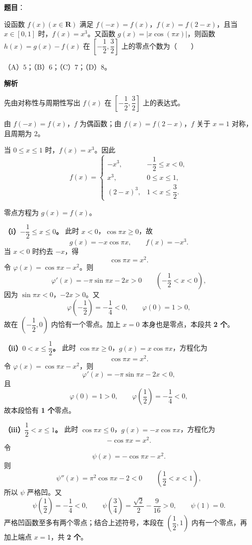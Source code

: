\begin{answer}

\textbf{题目}：

设函数 $f(x)(x\in\mathbf R)$ 满足 $f(-x)=f(x)$，$f(x)=f(2-x)$，且当 $x\in[0,1]$ 时，$f(x)=x^3$。又函数 $g(x)=|x\cos(\pi x)|$，则函数 $h(x)=g(x)-f(x)$ 在 $\left[-\dfrac12,\dfrac32\right]$ 上的零点个数为\mbox{（　　）}

（A）$5$；（B）$6$；（C）$7$；（D）$8$。

\textbf{解析}

先由对称性与周期性写出 $f(x)$ 在 $\left[-\dfrac12,\dfrac32\right]$ 上的表达式。

由 $f(-x)=f(x)$，$f$ 为偶函数；由 $f(x)=f(2-x)$，$f$ 关于 $x=1$ 对称，且周期为 $2$。

当 $0\leqslant x\leqslant1$ 时，$f(x)=x^3$。因此
\nopagebreak[4]
\[f(x)=\begin{cases}
-x^3,&-\dfrac12\leqslant x<0,\\[2mm]
x^3,&0\leqslant x\leqslant1,\\[2mm]
(2-x)^3,&1<x\leqslant\dfrac32.
\end{cases}\]

零点方程为 $g(x)=f(x)$。

\textbf{（i）$-\dfrac12\leqslant x\leqslant0$。} 此时 $x<0$，$\cos\pi x\geqslant0$，故
\nopagebreak[4]
\[g(x)=-x\cos\pi x,\qquad f(x)=-x^3.\]
当 $x<0$ 时约去 $-x$，得
\nopagebreak[4]
\[\cos\pi x=x^2.\]
令 $\varphi(x)=\cos\pi x-x^2$。则
\nopagebreak[4]
\[\varphi'(x)=-\pi\sin\pi x-2x>0\qquad\left(-\frac12<x<0\right),\]
因为 $\sin\pi x<0$，$-2x>0$。又
\nopagebreak[4]
\[\varphi\left(-\frac12\right)=-\frac14<0,\qquad \varphi(0)=1>0,\]
故在 $\left(-\dfrac12,0\right)$ 内恰有一个零点。加上 $x=0$ 本身也是零点，本段共 \textbf{2 个}。

\textbf{（ii）$0<x\leqslant\dfrac12$。} 此时 $\cos\pi x\geqslant0$，$g(x)=x\cos\pi x$，方程化为
\nopagebreak[4]
\[\cos\pi x=x^2.\]
令 $\varphi(x)=\cos\pi x-x^2$，则
\nopagebreak[4]
\[\varphi'(x)=-\pi\sin\pi x-2x<0,\]
且
\nopagebreak[4]
\[\varphi(0)=1>0,\qquad \varphi\left(\frac12\right)=-\frac14<0,\]
故本段恰有 \textbf{1 个}零点。

\textbf{（iii）$\dfrac12<x\leqslant1$。} 此时 $\cos\pi x\leqslant0$，$g(x)=-x\cos\pi x$，方程化为
\nopagebreak[4]
\[-\cos\pi x=x^2.\]
令
\nopagebreak[4]
\[\psi(x)=-\cos\pi x-x^2.\]
则
\nopagebreak[4]
\[\psi''(x)=\pi^2\cos\pi x-2<0\qquad\left(\frac12<x<1\right),\]
所以 $\psi$ 严格凹。又
\nopagebreak[4]
\[\psi\left(\frac12\right)=-\frac14<0,\qquad
\psi\left(\frac34\right)=\frac{\sqrt2}{2}-\frac9{16}>0,\qquad
\psi(1)=0.\]
严格凹函数至多有两个零点；结合上述符号，本段在 $\left(\dfrac12,1\right)$ 内有一个零点，再加上端点 $x=1$，共 \textbf{2 个}。


\end{answer}
